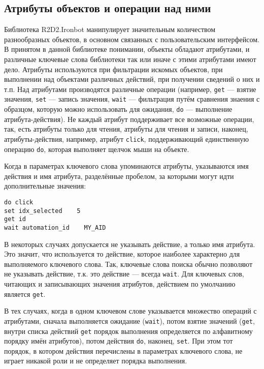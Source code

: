 \documentclass[11pt]{book} %
\begin{document}
\subsection{Атрибуты объектов и операции над ними}

Библиотека R2D2.Ironbot манипулирует значительным количеством разнообразных объектов, в основном связанных с пользовательским интерфейсом. В принятом в данной библиотеке понимании, объекты обладают атрибутами, и различные ключевые слова библиотеки так или иначе с этими атрибутами имеют дело. Атрибуты используются при фильтрации искомых объектов, при выполнении над объектами различных действий, при получении сведений о них и т.п. Над атрибутами производятся различные операции (например, \verb|get| --- взятие значения, \verb|set| --- запись значения, \verb|wait| --- фильтрация путём сравнения знаения с образцом, которую можно использовать для ожидания, \verb|do| --- выполнение атрибута-действия). Не каждый атрибут поддерживает все возможные операции, так, есть атрибуты только для чтения, атрибуты для чтения и записи, наконец, атрибуты-действия, например, атрибут \verb|click|, поддерживающий единственную операцию \verb|do|, которая выполняет щелчок мыши на объекте.

Когда в параметрах ключевого слова упоминаются атрибуты, указываются имя действия и имя атрибута, разделённые пробелом, за которыми могут идти дополнительные значения:

\begin{verbatim}
do click
set idx_selected    5
get id
wait automation_id    MY_AID
\end{verbatim}

В некоторых случаях допускается не указывать действие, а только имя атрибута. Это значит, что используется то действие, которое наиболее характерно для выполняемого ключевого слова. Так, ключевые слова поиска обычно позволяют не указывать действие, т.к. это действие --- всегда \verb|wait|. Для ключевых слов, читающих и записывающих значения атрибутов, действием по умолчанию является \verb|get|.

В тех случаях, когда в одном ключевом слове указывается множество операций с атрибутами, сначала выполняется ожидание (\verb|wait|), потом взятие значений (\verb|get|, внутри списка действий \verb|get| порядок выполнения определяется по алфавитному порядку имён атрибутов), потом действия \verb|do|, наконец, \verb|set|. При этом тот порядок, в котором действия перечислены в параметрах ключевого слова, не играет никакой роли и не определяет порядка выполнения.
\end{document}
